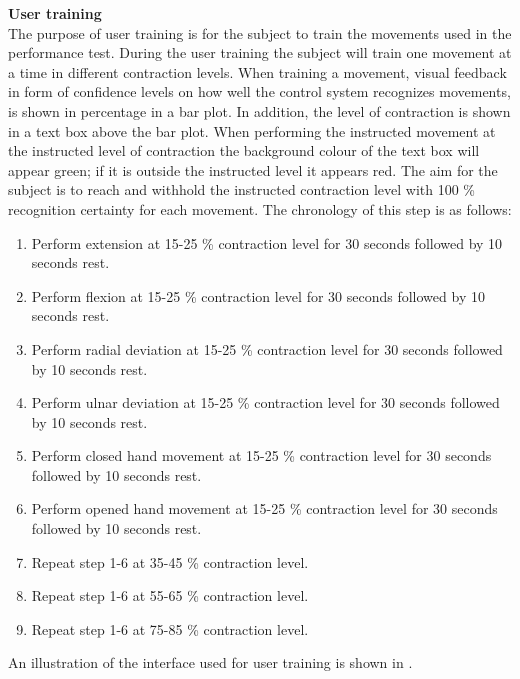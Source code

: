 \textbf{User training} \\ %
The purpose of user training is for the subject to train the movements used in the performance test. During the user training the subject will train one movement at a time in different contraction levels. When training a movement, visual feedback in form of confidence levels on how well the control system recognizes movements, is shown in percentage in a bar plot. In addition, the level of contraction is shown in a text box above the bar plot. When performing the instructed movement at the instructed level of contraction the background colour of the text box will appear green; if it is outside the instructed level it appears red. The aim for the subject is to reach and withhold the instructed contraction level with 100 \% recognition certainty for each movement. The chronology of this step is as follows:

\begin{enumerate}
	\item Perform extension at 15-25 \% contraction level for 30 seconds followed by 10 seconds rest.
	\item Perform flexion at 15-25 \% contraction level for 30 seconds followed by 10 seconds rest.
	\item Perform radial deviation at 15-25 \% contraction level for 30 seconds followed by 10 seconds rest.
	\item Perform ulnar deviation at 15-25 \% contraction level for 30 seconds followed by 10 seconds rest.
	\item Perform closed hand movement at 15-25 \% contraction level for 30 seconds followed by 10 seconds rest.
	\item Perform opened hand movement at 15-25 \% contraction level for 30 seconds followed by 10 seconds rest.
	\item Repeat step 1-6 at 35-45 \% contraction level.
	\item Repeat step 1-6 at 55-65 \% contraction level.
	\item Repeat step 1-6 at 75-85 \% contraction level.
\end{enumerate} 

An illustration of the interface used for user training is shown in .

